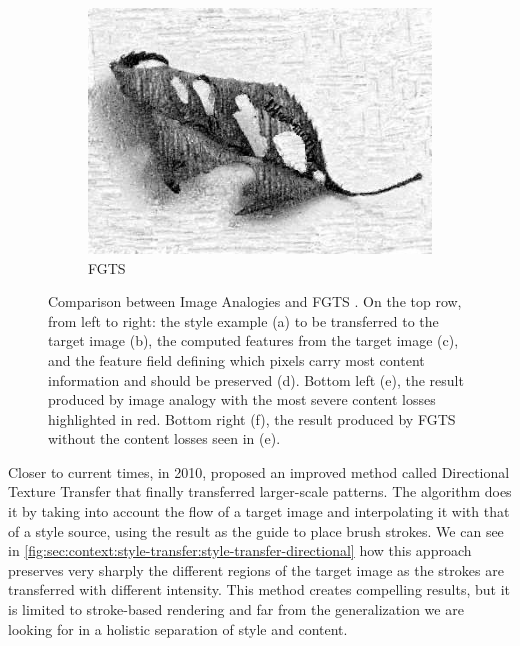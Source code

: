 \begin{figure}[htbp]
\begin{subfigure}[b]{0.5\textwidth}
    \includegraphics[width=\textwidth]{gfx/style-transfer-feature-6}
    \caption{FGTS}
  \end{subfigure}
  \caption{
    Comparison between Image Analogies and FGTS \citet{Xie2007}.
    On the top row, from left to right: the style example (a) to be transferred to the target image (b), the computed features from the target image (c), and the feature field defining which pixels carry most content information and should be preserved (d).
    Bottom left (e), the result produced by image analogy with the most severe content losses highlighted in red.
    Bottom right (f), the result produced by FGTS without the content losses seen in (e).
  }
  \label{fig:sec:context:style-transfer:style-transfer-feature}
\end{figure}

Closer to current times, in 2010, \citet{Lee2010} proposed an improved method called Directional Texture Transfer that finally transferred larger-scale patterns.
The algorithm does it by taking into account the flow of a target image and interpolating it with that of a style source, using the result as the guide to place brush strokes.
We can see in \autoref{fig:sec:context:style-transfer:style-transfer-directional} how this approach preserves very sharply the different regions of the target image as the strokes are transferred with different intensity.
This method creates compelling results, but it is limited to stroke-based rendering and far from the generalization we are looking for in a holistic separation of style and content.

